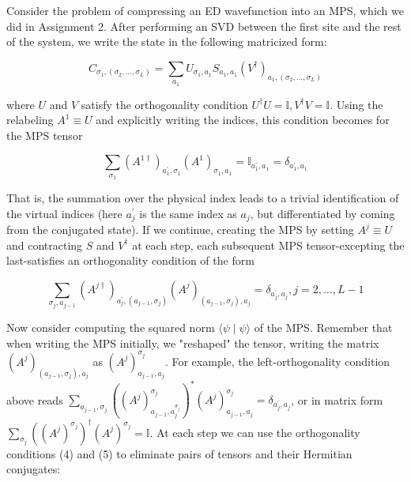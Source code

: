 \documentclass[12pt]{article}
\begin{document}
Consider the problem of compressing an ED wavefunction into an MPS, which we did in Assignment 2. After performing an SVD between the first site and the rest of the system, we write the state in the following matricized form:


\begin{equation*}
C_{\sigma_{1},\left(\sigma_{2}, \ldots, \sigma_{L}\right)}=\sum_{a_{1}} U_{\sigma_{1}, a_{1}} S_{a_{1}, a_{1}}\left(V^{\dagger}\right)_{a_{1},\left(\sigma_{2}, \ldots, \sigma_{L}\right)} \tag{3}
\end{equation*}


where $U$ and $V$ satisfy the orthogonality condition $U^{\dagger} U=\mathbb{I}, V^{\dagger} V=\mathbb{I}$. Using the relabeling $A^{1} \equiv U$ and explicitly writing the indices, this condition becomes for the MPS tensor


\begin{equation*}
\sum_{\sigma_{1}}\left(A^{1 \dagger}\right)_{a_{1}^{\prime}, \sigma_{1}}\left(A^{1}\right)_{\sigma_{1}, a_{1}}=\mathbb{I}_{a_{1}^{\prime}, a_{1}}=\delta_{a_{1}^{\prime}, a_{1}} \tag{4}
\end{equation*}


That is, the summation over the physical index leads to a trivial identification of the virtual indices (here $a_{j}^{\prime}$ is the same index as $a_{j}$, but differentiated by coming from the conjugated state). If we continue, creating the MPS by setting $A^{j} \equiv U$ and contracting $S$ and $V^{\dagger}$ at each step, each subsequent MPS tensor-excepting the last-satisfies an orthogonality condition of the form


\begin{equation*}
\sum_{\sigma_{j}, a_{j-1}}\left(A^{j \dagger}\right)_{a_{j}^{\prime},\left(a_{j-1}, \sigma_{j}\right)}\left(A^{j}\right)_{\left(a_{j-1}, \sigma_{j}\right), a_{j}}=\delta_{a_{j}^{\prime}, a_{j}}, j=2, \ldots, L-1 \tag{5}
\end{equation*}


Now consider computing the squared norm $\langle\psi \mid \psi\rangle$ of the MPS. Remember that when writing the MPS initially, we "reshaped" the tensor, writing the matrix $\left(A^{j}\right)_{\left(a_{j-1}, \sigma_{j}\right), a_{j}}$ as $\left(A^{j}\right)_{a_{j-1}, a_{j}}^{\sigma_{j}}$. For example, the left-orthogonality condition above reads $\sum_{a_{j-1}, \sigma_{j}}\left(\left(A^{j}\right)_{a_{j-1}, a_{j}^{\sigma_{j}}}^{\sigma_{j}}\right)^{*}\left(A^{j}\right)_{a_{j-1}, a_{j}}^{\sigma_{j}}=\delta_{a_{j}^{\prime}, a_{j}}$, or in matrix form $\sum_{\sigma_{j}}\left(\left(A^{j}\right)^{\sigma_{j}}\right)^{\dagger}\left(A^{j}\right)^{\sigma_{j}}=\mathbb{I}$. At each step we can use the orthogonality conditions (4) and (5) to eliminate pairs of tensors and their Hermitian conjugates:
\end{document}
